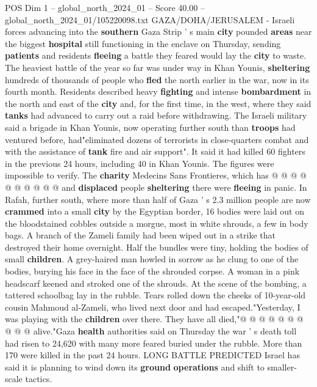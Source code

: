 \begin{textsample}{POS Dim 1 – global\_north\_2024\_01 – Score 40.00 – global\_north\_2024\_01/105220098.txt}  \label{ex:f1_pos_160}
GAZA/DOHA/JERUSALEM - Israeli forces advancing into the \textbf{southern} Gaza Strip ' s main \textbf{city} pounded \textbf{areas} near the biggest \textbf{hospital} still functioning in the enclave on Thursday, sending \textbf{patients} and residents \textbf{fleeing} a battle they feared would lay the \textbf{city} to waste.
The heaviest battle of the year so far was under way in Khan Younis, \textbf{sheltering} hundreds of thousands of people who \textbf{fled} the north earlier in the war, now in its fourth month.
Residents described heavy \textbf{fighting} and intense \textbf{bombardment} in the north and east of the \textbf{city} and, for the first time, in the west, where they said \textbf{tanks} had advanced to carry out a raid before withdrawing.
The Israeli military said a brigade in Khan Younis, now operating further south than \textbf{troops} had ventured before, had"eliminated dozens of terrorists in close-quarters combat and with the assistance of \textbf{tank} fire and air support".
It said it had killed 60 fighters in the previous 24 hours, including 40 in Khan Younis.
The figures were impossible to verify.
The \textbf{charity} Medecins Sans Frontieres, which has @ @ @ @ @ @ @ @ @ @ and \textbf{displaced} people \textbf{sheltering} there were \textbf{fleeing} in panic.
In Rafah, further south, where more than half of Gaza ' s 2.3 million people are now \textbf{crammed} into a small \textbf{city} by the Egyptian border, 16 bodies were laid out on the bloodstained cobbles outside a morgue, most in white shrouds, a few in body bags.
A branch of the Zameli family had been wiped out in a strike that destroyed their home overnight.
Half the bundles were tiny, holding the bodies of small \textbf{children}.
A grey-haired man howled in sorrow as he clung to one of the bodies, burying his face in the face of the shrouded corpse.
A woman in a pink headscarf keened and stroked one of the shrouds.
At the scene of the bombing, a tattered schoolbag lay in the rubble.
Tears rolled down the cheeks of 10-year-old cousin Mahmoud al-Zameli, who lived next door and had escaped."Yesterday, I was playing with the \textbf{children} over there.
They have all died,"@ @ @ @ @ @ @ @ @ @ alive."Gaza \textbf{health} authorities said on Thursday the war ' s death toll had risen to 24,620 with many more feared buried under the rubble.
More than 170 were killed in the past 24 hours.
LONG BATTLE PREDICTED Israel has said it is planning to wind down its \textbf{ground} \textbf{operations} and shift to smaller-scale tactics.

\end{textsample}
